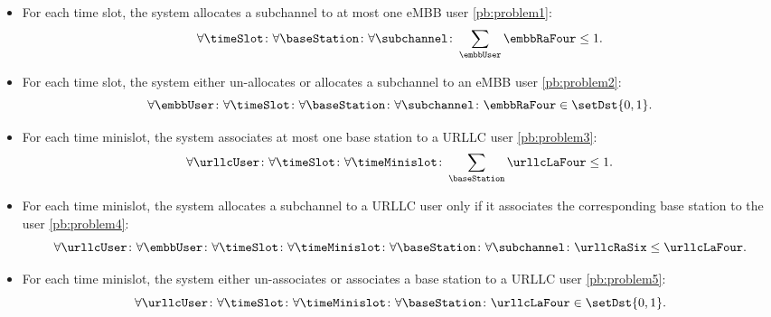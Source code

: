 \begin{frame}
  \begin{itemize}
    \item For each time slot, the system allocates a subchannel to at most one eMBB user \eqref{pb:problem1}:
      \begin{equation*}
        \forall\timeSlot \colon \forall\baseStation \colon \forall\subchannel \colon \sum_{\embbUser}{\embbRaFour} \leq 1.
      \end{equation*}
    \item For each time slot, the system either un-allocates or allocates a subchannel to an eMBB user \eqref{pb:problem2}:
      \begin{equation*}
        \forall\embbUser \colon \forall\timeSlot \colon \forall\baseStation \colon \forall\subchannel \colon \embbRaFour \in \setDst{0, 1}.
      \end{equation*}
  \end{itemize}
\end{frame}

\begin{frame}
  \begin{itemize}
    \item For each time minislot, the system associates at most one base station to a URLLC user \eqref{pb:problem3}:
      \begin{equation*}
        \forall\urllcUser \colon \forall\timeSlot \colon \forall\timeMinislot \colon \sum_{\baseStation}{\urllcLaFour} \leq 1.
      \end{equation*}
    \item For each time minislot, the system allocates a subchannel to a URLLC user only if it associates the corresponding base station to the user \eqref{pb:problem4}:
      \begin{equation*}
        \forall\urllcUser \colon \forall\embbUser \colon \forall\timeSlot \colon \forall\timeMinislot \colon \forall\baseStation \colon \forall\subchannel \colon \urllcRaSix \leq \urllcLaFour.
      \end{equation*}
    \item For each time minislot, the system either un-associates or associates a base station to a URLLC user \eqref{pb:problem5}:
      \begin{equation*}
        \forall\urllcUser \colon \forall\timeSlot \colon \forall\timeMinislot \colon \forall\baseStation \colon \urllcLaFour \in \setDst{0, 1}.
      \end{equation*}
  \end{itemize}
\end{frame}


